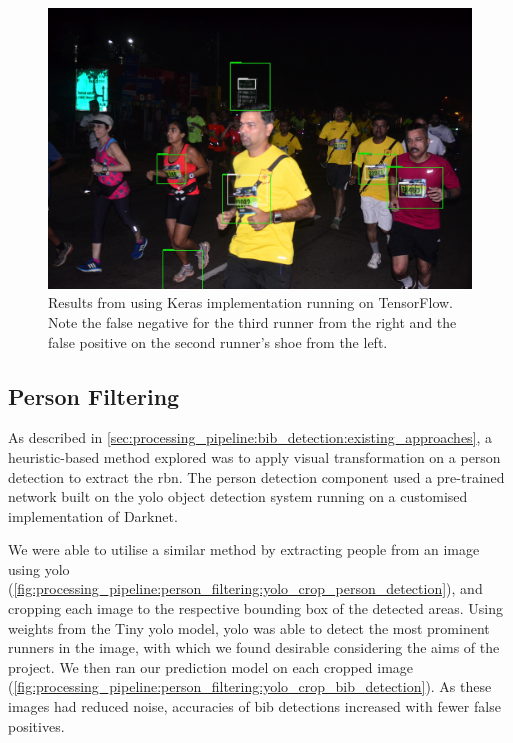 \begin{figure}[h]
  \includegraphics[width=\textwidth]{images/processing/bib_only}
  \caption[Bib detection results using FRCNN]{Results from using \frcnn{} Keras implementation running on TensorFlow. Note the false negative for the third runner from the right and the false positive on the second runner's shoe from the left.}
  \label{fig:processing_pipeline:bib_only}
\end{figure}


\subsection{Person Filtering}
\label{sec:processing_pipeline:person_filtering}

As described in \cref{sec:processing_pipeline:bib_detection:existing_approaches}, a heuristic-based method explored was to apply visual transformation on a person detection to extract the \gls{rbn}. The person detection component used a pre-trained network built on the \gls{yolo} object detection system running on a customised implementation of Darknet.

We were able to utilise a similar method by extracting people from an image using \gls{yolo} (\cref{fig:processing_pipeline:person_filtering:yolo_crop_person_detection}), and cropping each image to the respective bounding box of the detected areas. Using weights from the Tiny \gls{yolo} model, \gls{yolo} was able to detect the most prominent runners in the image, with which we found desirable considering the aims of the project. We then ran our \frcnn{} prediction model on each cropped image (\cref{fig:processing_pipeline:person_filtering:yolo_crop_bib_detection}). As these images had reduced noise, accuracies of bib detections increased with fewer false positives. 

